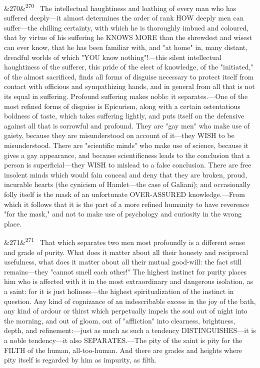 \documentclass[12pt]{article}
\newcommand{\para}[1][]{\par\noindent\ifx&#1&\else\textsuperscript{\footnotesize #1}~\fi}
\begin{document}
\para[270] The intellectual haughtiness and loathing of every man who has suffered deeply---it almost determines the order of rank HOW deeply men can suffer---the chilling certainty, with which he is thoroughly imbued and coloured, that by virtue of his suffering he KNOWS MORE than the shrewdest and wisest can ever know, that he has been familiar with, and "at home" in, many distant, dreadful worlds of which "YOU know nothing"!---this silent intellectual haughtiness of the sufferer, this pride of the elect of knowledge, of the "initiated," of the almost sacrificed, finds all forms of disguise necessary to protect itself from contact with officious and sympathizing hands, and in general from all that is not its equal in suffering. Profound suffering makes noble: it separates.---One of the most refined forms of disguise is Epicurism, along with a certain ostentatious boldness of taste, which takes suffering lightly, and puts itself on the defensive against all that is sorrowful and profound. They are "gay men" who make use of gaiety, because they are misunderstood on account of it---they WISH to be misunderstood. There are "scientific minds" who make use of science, because it gives a gay appearance, and because scientificness leads to the conclusion that a person is superficial---they WISH to mislead to a false conclusion. There are free insolent minds which would fain conceal and deny that they are broken, proud, incurable hearts (the cynicism of Hamlet---the case of Galiani); and occasionally folly itself is the mask of an unfortunate OVER-ASSURED knowledge.---From which it follows that it is the part of a more refined humanity to have reverence "for the mask," and not to make use of psychology and curiosity in the wrong place.

\para[271] That which separates two men most profoundly is a different sense and grade of purity. What does it matter about all their honesty and reciprocal usefulness, what does it matter about all their mutual good-will: the fact still remains---they "cannot smell each other!" The highest instinct for purity places him who is affected with it in the most extraordinary and dangerous isolation, as a saint: for it is just holiness---the highest spiritualization of the instinct in question. Any kind of cognizance of an indescribable excess in the joy of the bath, any kind of ardour or thirst which perpetually impels the soul out of night into the morning, and out of gloom, out of "affliction" into clearness, brightness, depth, and refinement:---just as much as such a tendency DISTINGUISHES---it is a noble tendency---it also SEPARATES.---The pity of the saint is pity for the FILTH of the human, all-too-human. And there are grades and heights where pity itself is regarded by him as impurity, as filth.
\end{document}
